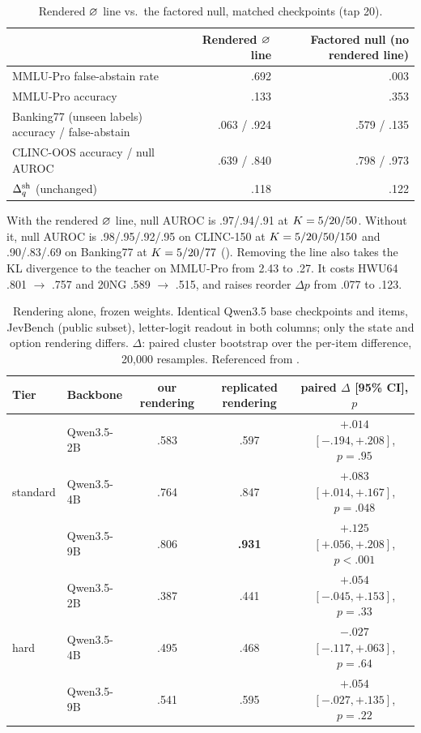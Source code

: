 \begin{table}[h]
  \centering
  \caption{Rendered $\varnothing$ line vs.\ the factored null, matched checkpoints (tap 20).}
  \label{tab:app-null-fix}
  \small
  \begin{tabular}{lrr}
    \toprule
    & Rendered $\varnothing$ line & Factored null (no rendered line) \\
    \midrule
    MMLU-Pro false-abstain rate & .692 & .003 \\
    MMLU-Pro accuracy & .133 & .353 \\
    Banking77 (unseen labels) accuracy / false-abstain & .063 / .924 & .579 / .135 \\
    CLINC-OOS accuracy / null AUROC & .639 / .840 & .798 / .973 \\
    $\Delta_q^{\mathrm{sh}}$ (unchanged) & .118 & .122 \\
    \bottomrule
  \end{tabular}
\end{table}

With the rendered $\varnothing$ line, null AUROC is .97/.94/.91 at $K = 5/20/50$.
Without it, null AUROC is .98/.95/.92/.95 on CLINC-150 at $K = 5/20/50/150$ and .90/.83/.69 on
Banking77 at $K = 5/20/77$ (). Removing the line also takes the KL
divergence to the teacher on MMLU-Pro from 2.43 to .27. It costs HWU64 .801 $\to$ .757 and 20NG .589
$\to$ .515, and raises reorder $\Delta p$ from .077 to .123.

\begin{table}[h]
  \centering
  \caption{Rendering alone, frozen weights. Identical Qwen3.5 base checkpoints and items, JevBench (public
  subset), letter-logit readout in both columns; only the state and option rendering differs. $\Delta$:
  paired cluster bootstrap over the per-item difference, 20{,}000 resamples. Referenced from .}
  \label{tab:rendering}
  \small
  \setlength{\tabcolsep}{4pt}
  \begin{tabular}{llccc}
    \toprule
    Tier & Backbone & our rendering & replicated rendering & paired $\Delta$ [95\% CI], $p$ \\
    \midrule
    \multirow{3}{*}{standard} & Qwen3.5-2B & .583 & .597 & $+.014$ $[-.194, +.208]$, $p{=}.95$ \\
     & Qwen3.5-4B & .764 & .847 & $+.083$ $[+.014, +.167]$, $p{=}.048$ \\
     & Qwen3.5-9B & .806 & \textbf{.931} & $\mathbf{+.125}$ $[+.056, +.208]$, $p{<}.001$ \\
    \midrule
    \multirow{3}{*}{hard} & Qwen3.5-2B & .387 & .441 & $+.054$ $[-.045, +.153]$, $p{=}.33$ \\
     & Qwen3.5-4B & .495 & .468 & $-.027$ $[-.117, +.063]$, $p{=}.64$ \\
     & Qwen3.5-9B & .541 & .595 & $+.054$ $[-.027, +.135]$, $p{=}.22$ \\
    \bottomrule
  \end{tabular}
\end{table}

